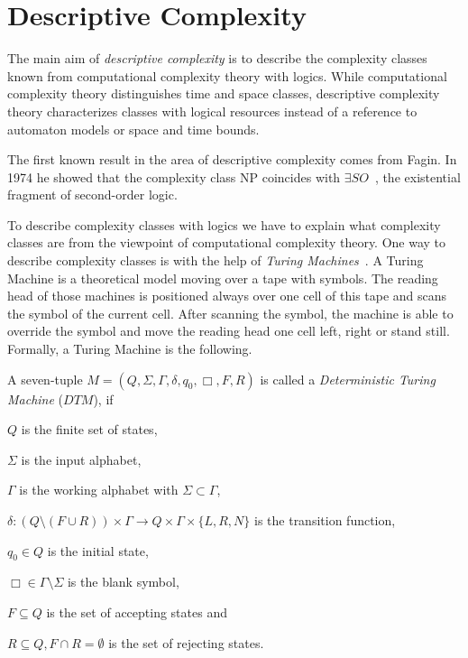 

\section{Descriptive Complexity}\label{sec:descriptiveComplexity}

The main aim of \emph{descriptive complexity} is to describe the complexity classes known from
computational complexity theory with logics. While computational complexity theory distinguishes time and space
classes, descriptive complexity theory characterizes classes with logical resources instead of a reference to
automaton models or space and time bounds.

The first known result in the area of descriptive complexity comes from Fagin. In 1974 he showed that the complexity
class NP coincides with $\exists SO$~\cite{fagin1974generalized}, the existential fragment of second-order logic.

To describe complexity classes with logics we have to explain what complexity classes are from the viewpoint of
computational complexity theory. One way to describe complexity classes is with the help of \textit{Turing
Machines}~\cite{hopcroft1994einfuehrung}.
A Turing Machine is a theoretical model moving over a tape with symbols. The reading head of
those machines is positioned always over one cell of this tape and scans the symbol of the current cell. After scanning
the symbol, the machine is able to override the symbol and move the reading head one cell left, right or stand still.
Formally, a Turing Machine is the following.

\begin{definition}
\label{definition:dtm}
    A seven-tuple $M = (Q, \Sigma, \Gamma, \delta, q_0, \Box, F, R)$ is called a \emph{Deterministic Turing Machine}
    ($\mathit{DTM}$), if
    \begin{compactitem}
        \item $Q$ is the finite set of states,
        \item $\Sigma$ is the input alphabet,
        \item $\Gamma$ is the working alphabet with $\Sigma \subset \Gamma$,
        \item $\delta : (Q \setminus (F \cup R)) \times \Gamma \rightarrow Q \times \Gamma \times \{L, R, N\}$ is the
        transition function,
        \item $q_0 \in Q$ is the initial state,
        \item $\Box \in \Gamma \setminus \Sigma$ is the blank symbol,
        \item $F \subseteq Q$ is the set of accepting states and
        \item $R \subseteq Q, F \cap R = \emptyset$ is the set of rejecting states.
    \end{compactitem}
\end{definition}

